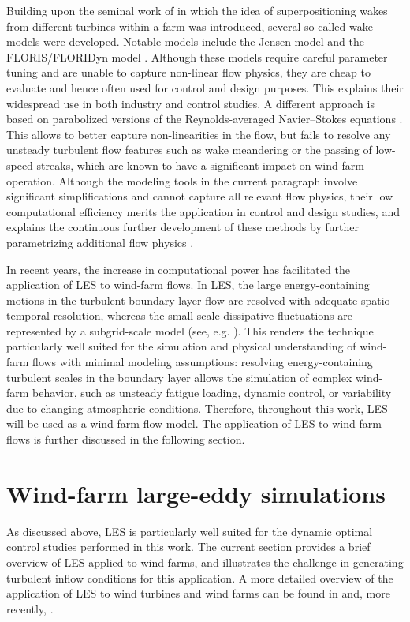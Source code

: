 Building upon the seminal work of \cite{lissaman} in which the idea of superpositioning wakes from different turbines within a farm was introduced, several so-called wake models were developed. Notable models include the Jensen model \citep{katic1986simple, jensen1983note} and the FLORIS/FLORIDyn model \citep{gebraad2014data, gebraad2014control}. Although these models require careful parameter tuning and are unable to capture non-linear flow physics, they are cheap to evaluate and hence often used for control and design purposes. This explains their widespread use in both industry and control studies. A different approach is based on parabolized versions of the Reynolds-averaged Navier--Stokes equations \citep{ainslie88, crespo1988experimental, van2006improvements}. This allows to better capture non-linearities in the flow, but fails to resolve any unsteady turbulent flow features such as wake meandering or the passing of low-speed streaks, which are known to have a significant impact on wind-farm operation. Although the modeling tools in the current paragraph involve significant simplifications and cannot capture all relevant flow physics, their low computational efficiency merits the application in control and design studies, and explains the continuous further development of these methods by further parametrizing additional flow physics \citep{larsen2008wake, keck2014atmospheric, gebraad2016incorporating}. 

In recent years, the increase in computational power has facilitated the application of LES to wind-farm flows. In LES, the large energy-containing motions in the turbulent boundary layer flow are resolved with adequate spatio-temporal resolution, whereas the small-scale dissipative fluctuations are represented by a subgrid-scale model (see, e.g. \citealp{sagaut2006large}). This renders the technique particularly well suited for the simulation and physical understanding of wind-farm flows with minimal modeling assumptions: resolving energy-containing turbulent scales in the boundary layer allows the simulation of complex wind-farm behavior, such as unsteady fatigue loading, dynamic control, or variability due to changing atmospheric conditions. Therefore, throughout this work, LES will be used as a wind-farm flow model. The application of LES to wind-farm flows is further discussed in the following section. 

\section{Wind-farm large-eddy simulations}\label{sec:intro_les}
As discussed above, LES is particularly well suited for the dynamic optimal control studies performed in this work. The current section provides a brief overview of LES applied to wind farms, and illustrates the challenge in generating turbulent inflow conditions for this application. A more detailed overview of the application of LES to wind turbines and wind farms can be found in \cite{sanderse2011review,mehta2014large} and, more recently, \cite{breton2017survey}. 

